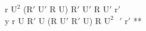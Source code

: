 r $\text{U}^2$ ($\text{R}'$ $\text{U}'$ R U) $\text{R}'$ $\text{U}'$ R $\text{U}'$ $\text{r}'$\\
y r U $\text{R}'$ U (R $\text{U}'$ $\text{R}'$ U) R $\text{U}^2$$\text{ }'$ $\text{r}'$ **\\
